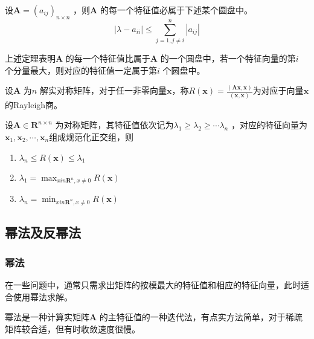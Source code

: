\documentclass[a4paper]{article}
\begin{document}
\begin{theorem}
	设$\mathbf{A} = (a_{ij})_{n \times n}$ ，则$\mathbf{A}$ 的每一个特征值必属于下述某个圆盘中。
	\[
		| \lambda - a_{ii} | \le \sum_{j=1, j \neq i}^{n} | a_{ij} |
	\] 
\end{theorem}
上述定理表明$\mathbf{A}$ 的每一个特征值比属于$\mathbf{A}$ 的一个圆盘中，若一个特征向量的第$i$ 个分量最大，则对应的特征值一定属于第$i$ 个圆盘中。

\begin{definition}
	设$\mathbf{A}$ 为$n$ 解实对称矩阵，对于任一非零向量$\mathbf{x}$，称$R(\mathbf{x}) = \frac{(\mathbf{Ax}, \mathbf{x})}{(\mathbf{x},\mathbf{x})}$为对应于向量$\mathbf{x}$ 的Rayleigh商。
\end{definition}

\begin{theorem}
	设$\mathbf{A} \in \mathbf{R}^{n \times n}$ 为对称矩阵，其特征值依次记为$\lambda_1 \ge \lambda_2 \ge \cdots \lambda_n$ ，对应的特征向量为$\mathbf{x}_1, \mathbf{x}_2, \cdots, \mathbf{x}_n$组成规范化正交组，则
	\begin{enumerate}
		\item $\lambda_n \le R(\mathbf{x}) \le \lambda_1$
		\item $\lambda_1 = \max_{x in \mathbf{R}^{n}, x \neq 0} R(\mathbf{x})$
		\item $\lambda_n = \min_{x in \mathbf{R}^{n}, x \neq 0} R(\mathbf{x})$
	\end{enumerate}
\end{theorem}

\subsection{幂法及反幂法}
\subsubsection{幂法}
在一些问题中，通常只需求出矩阵的按模最大的特征值和相应的特征向量，此时适合使用幂法求解。

幂法是一种计算实矩阵$\mathbf{A}$ 的主特征值的一种迭代法，有点实方法简单，对于稀疏矩阵较合适，但有时收敛速度很慢。
\end{document}
